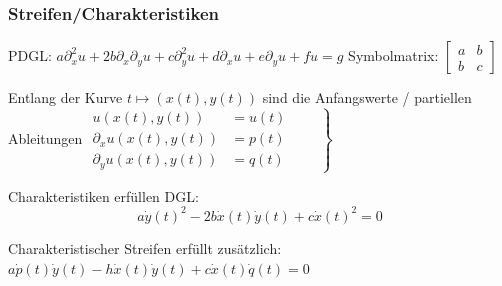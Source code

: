 \subsubsection{Streifen/Charakteristiken}
	PDGL: $a\partial_x^2u+2b\partial_x\partial_yu+c\partial_y^2u+d\partial_xu+e\partial_yu+fu=g$ Symbolmatrix: $ 
		\begin{bmatrix}
			a & b\\
			b & c
		\end{bmatrix}$
	
	Entlang der Kurve $t\mapsto(x(t),y(t))$ sind die Anfangswerte / partiellen Ableitungen
	$
	\left.
	\begin{aligned}
	u(x(t),y(t))&=u(t)\\
	\partial_xu(x(t),y(t))&=p(t)\\
	\partial_yu(x(t),y(t))&=q(t)
	\end{aligned}
	\qquad
	\right\}
	\label{charanfangs}
	$
	
	Charakteristiken erfüllen DGL:
    \[
        a\dot y(t)^2-2b\dot x(t)\dot y(t)+c\dot x(t)^2=0
    \]
	
	Charakteristischer Streifen erfüllt zusätzlich: $a\dot p(t)\dot y(t)-h\dot x(t)\dot y(t)+c\dot x(t)\dot q(t)=0$